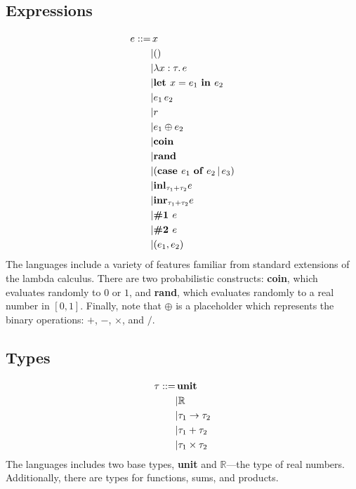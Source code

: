 \documentclass{article}
\begin{document}
		\begin{multicols}{2}
		\subsection{Expressions}
			\begin{equation*}
				\begin{split}
					e ::=
					&\, x \\
					&| () \\
					&| \lambda x : \tau.\, e \\
					&| \text{\bf let } x = e_1 \text{ \bf in } e_2 \\
					&| e_1\, e_2 \\
					&| r \\
					&| e_1 \oplus e_2 \\
					&| {\bf coin} \\
					&| {\bf rand} \\
					&| (\text{\bf case } e_1 \text{ \bf of } e_2 \,|\, e_3) \\
					&| {\bf inl}_{\tau_1 + \tau_2} e \\
					&| {\bf inr}_{\tau_1 + \tau_2} e \\
					&| \text{\bf \#1 } e \\
					&| \text{\bf \#2 } e \\
					&| (e_1, e_2) \\
				\end{split}
			\end{equation*}
			The languages include a variety of features familiar from standard extensions of the lambda calculus.
			There are two probabilistic constructs: {\bf coin}, which evaluates randomly to $0$ or $1$, and {\bf rand}, which evaluates randomly to a real number in $[0, 1]$.
			Finally, note that $\oplus$ is a placeholder which represents the binary operations: $+$, $-$, $\times$, and $/$.
			
		\subsection{Types}
			\begin{equation*}
				\begin{split}
					\tau ::=
					&\, {\bf unit} \\
					&| \mathbb{R} \\
					&| \tau_1 \to \tau_2 \\
					&| \tau_1 + \tau_2 \\
					&| \tau_1 \times \tau_2 \\
				\end{split}
			\end{equation*}
			The languages includes two base types, {\bf unit} and $\mathbb{R}$---the type of real numbers. 
			Additionally, there are types for functions, sums, and products.
			\end{multicols}
		
\end{document}
